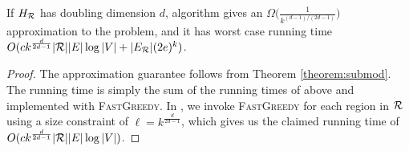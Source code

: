 \begin{theorem}
\label{theorem:maxcrit-app}
If $H_{\mathcal{R}}$ has doubling dimension $d$, algorithm  \algomaxcrit{} gives an $\Omega\Big(\frac{1}{k^{(d-1)/(2d-1)}}\Big)$ approximation to the \maxcrit{} problem, and it has worst case running time $O(ck^{\frac{d}{2d - 1}}|\mathcal{R}||E|\log{|V|} + |E_{\mathcal{R}}|(2e)^k)$.
\end{theorem}

\begin{proof}
The approximation guarantee follows from Theorem \ref{theorem:submod}. The running time is simply the sum of the running times of \algomaxst{} above and  \algosubmod{} implemented with \textsc{FastGreedy}. In \algosubmod{}, we invoke \textsc{FastGreedy} for each region in $\mathcal{R}$ using a size constraint of $\ell = k^{\frac{d}{2d - 1}}$, which gives us the claimed running time of $O(ck^{\frac{d}{2d - 1}}|\mathcal{R}||E|\log{|V|})$.
\end{proof}